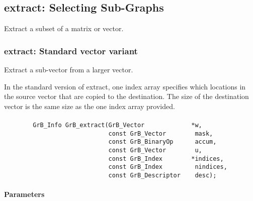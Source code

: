 \subsection{{\sf extract}: Selecting Sub-Graphs}
\label{Sec:extract}

Extract a subset of a matrix or vector. 


\subsubsection{{\sf extract}: Standard vector variant}

Extract a sub-vector from a larger vector. 

In the standard version of {\sf extract}, one index array
specifies which locations in the source vector that are copied to
the destination.  The size of the destination vector is the same size as
the one index array provided.  

\paragraph{\syntax}

\begin{verbatim}
        GrB_Info GrB_extract(GrB_Vector             *w,
                             const GrB_Vector        mask,
                             const GrB_BinaryOp      accum,
                             const GrB_Vector        u,
                             const GrB_Index        *indices,
                             const GrB_Index         nindices,
                             const GrB_Descriptor    desc);
\end{verbatim}

\paragraph{Parameters}

